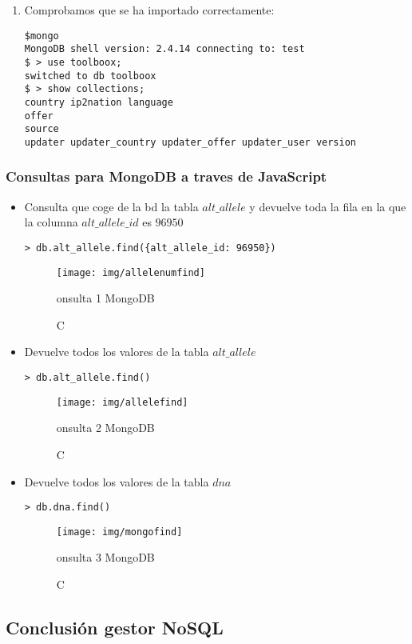 \documentclass[12pt,a4paper]{article}
\begin{document}
\begin{enumerate}
\item Comprobamos que se ha importado correctamente:
\begin{verbatim} 
$mongo
MongoDB shell version: 2.4.14 connecting to: test
$ > use toolboox;
switched to db toolboox
$ > show collections;
country ip2nation language
offer
source
updater updater_country updater_offer updater_user version
\end{verbatim}

\end{enumerate}



\subsubsection{Consultas para MongoDB a traves de JavaScript} \label{pto522}

\begin{itemize}
\item Consulta que coge de la bd la tabla $alt\_allele$ y devuelve toda la fila en la que la columna $alt\_allele\_id$ es $96950$
 
\verb|> db.alt_allele.find({alt_allele_id: 96950})|

\begin{figure}[!h]
\centering
\texttt{[image: img/allelenumfind]}
\caption Consulta 1 MongoDB
\label{mongo1}
\end{figure}

\item Devuelve todos los valores de la tabla  $alt\_allele$ 

\verb|> db.alt_allele.find()|

\begin{figure}[!h]
\centering
\texttt{[image: img/allelefind]}
\caption Consulta 2 MongoDB
\label{mongo2}
\end{figure}


\item Devuelve todos los valores de la tabla  $dna$ 

\verb|> db.dna.find()|

\begin{figure}[!h]
\centering
\texttt{[image: img/mongofind]}
\caption Consulta 3 MongoDB
\label{mongo3}
\end{figure}
\end{itemize}




\subsection{Conclusión gestor NoSQL}  \label{pto53}
\end{document}
